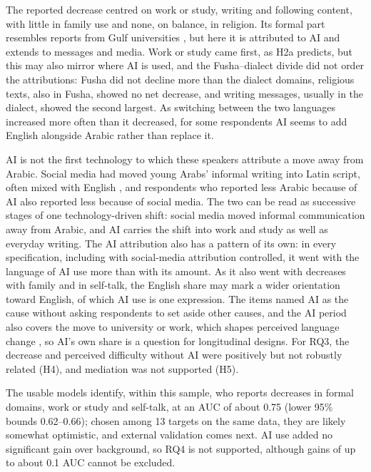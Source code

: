 \documentclass[conference]{IEEEtran}
\begin{document}
The reported decrease centred on work or study, writing and following content, with little in family use and none, on balance, in religion. Its formal part resembles reports from Gulf universities \cite{mustafawi2022,masri2019}, but here it is attributed to AI and extends to messages and media. Work or study came first, as H2a predicts, but this may also mirror where AI is used, and the Fusha--dialect divide did not order the attributions: Fusha did not decline more than the dialect domains, religious texts, also in Fusha, showed no net decrease, and writing messages, usually in the dialect, showed the second largest. As switching between the two languages increased more often than it decreased, for some respondents AI seems to add English alongside Arabic rather than replace it.

AI is not the first technology to which these speakers attribute a move away from Arabic. Social media had moved young Arabs' informal writing into Latin script, often mixed with English \cite{alghamdi2018,bianchi2012}, and respondents who reported less Arabic because of AI also reported less because of social media. The two can be read as successive stages of one technology-driven shift: social media moved informal communication away from Arabic, and AI carries the shift into work and study as well as everyday writing. The AI attribution also has a pattern of its own: in every specification, including with social-media attribution controlled, it went with the language of AI use more than with its amount. As it also went with decreases with family and in self-talk, the English share may mark a wider orientation toward English, of which AI use is one expression. The items named AI as the cause without asking respondents to set aside other causes, and the AI period also covers the move to university or work, which shapes perceived language change \cite{wirtz2025}, so AI's own share is a question for longitudinal designs. For RQ3, the decrease and perceived difficulty without AI were positively but not robustly related (H4), and mediation was not supported (H5).

The usable models identify, within this sample, who reports decreases in formal domains, work or study and self-talk, at an AUC of about 0.75 (lower 95\% bounds 0.62--0.66); chosen among 13 targets on the same data, they are likely somewhat optimistic, and external validation comes next. AI use added no significant gain over background, so RQ4 is not supported, although gains of up to about 0.1 AUC cannot be excluded.
\end{document}
